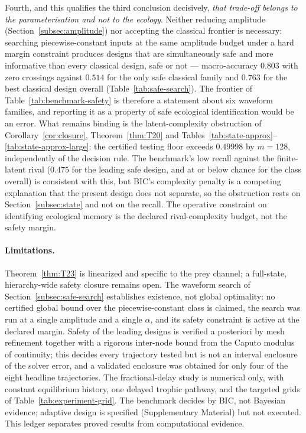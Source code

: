 Fourth, and this qualifies the third conclusion decisively, \emph{that trade-off belongs to the parameterisation and not to the ecology}. Neither reducing amplitude (Section~\ref{subsec:amplitude}) nor accepting the classical frontier is necessary: searching piecewise-constant inputs at the same amplitude budget under a hard margin constraint produces designs that are simultaneously safe and more informative than every classical design, safe or not --- macro-accuracy $0.803$ with zero crossings against $0.514$ for the only safe classical family and $0.763$ for the best classical design overall (Table~\ref{tab:safe-search}). The frontier of Table~\ref{tab:benchmark-safety} is therefore a statement about six waveform families, and reporting it as a property of safe ecological identification would be an error. What remains binding is the latent-complexity obstruction of Corollary~\ref{cor:closure}, Theorem~\ref{thm:T20} and Tables~\ref{tab:state-approx}--\ref{tab:state-approx-large}: the certified testing floor exceeds $0.49998$ by $m=128$, independently of the decision rule. The benchmark's low recall against the finite-latent rival ($0.475$ for the leading safe design, and at or below chance for the class overall) is consistent with this, but BIC's complexity penalty is a competing explanation that the present design does not separate, so the obstruction rests on Section~\ref{subsec:state} and not on the recall. The operative constraint on identifying ecological memory is the declared rival-complexity budget, not the safety margin.

\paragraph{Limitations.}
Theorem~\ref{thm:T23} is linearized and specific to the prey channel; a full-state, hierarchy-wide safety closure remains open. The waveform search of Section~\ref{subsec:safe-search} establishes existence, not global optimality: no certified global bound over the piecewise-constant class is claimed, the search was run at a single amplitude and a single $\alpha$, and its safety constraint is active at the declared margin. Safety of the leading designs is verified a posteriori by mesh refinement together with a rigorous inter-node bound from the Caputo modulus of continuity; this decides every trajectory tested but is not an interval enclosure of the solver error, and a validated enclosure was obtained for only four of the eight headline trajectories. The fractional-delay study is numerical only, with constant equilibrium history, one delayed trophic pathway, and the targeted grids of Table~\ref{tab:experiment-grid}. The benchmark decides by BIC, not Bayesian evidence; adaptive design is specified (Supplementary Material) but not executed. This ledger separates proved results from computational evidence.

